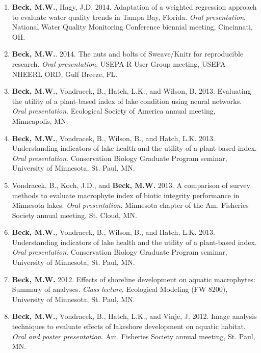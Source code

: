 \documentclass[letterpaper,12pt]{article}
\begin{document}
\begin{enumerate}
\item {\bf Beck, M.W.}, Hagy, J.D. 2014. Adaptation of a weighted regression approach to evaluate water quality trends in {T}ampa {B}ay, {F}lorida. \textit{Oral presentation}. National Water Quality Monitoring Conference biennial meeting, Cincinnati, OH.

\item {\bf Beck, M.W.}. 2014. The nuts and bolts of Sweave/Knitr for reproducible research. \textit{Oral presentation}. USEPA R User Group meeting, USEPA NHEERL ORD, Gulf Breeze, FL.

\item {\bf Beck, M.W.}, Vondracek, B., Hatch, L.K., and Wilson, B. 2013. Evaluating the utility of a plant-based index of lake condition using neural networks. \textit{Oral presentation}. Ecological Society of America annual meeting, Minneapolis, MN.

\item {\bf Beck, M.W.}, Vondracek, B., Wilson, B., and Hatch, L.K. 2013. Understanding indicators of lake health and the utility of a plant-based index. \textit{Oral presentation}. Conservation Biology Graduate Program seminar, University of Minnesota, St. Paul, MN.

\item Vondracek, B., Koch, J.D., and {\bf Beck, M.W.} 2013. A comparison of survey methods to evaluate macrophyte index of biotic integrity performance in Minnesota lakes. \textit{Oral presentation}. Minnesota chapter of the Am. Fisheries Society annual meeting, St. Cloud, MN.

\item {\bf Beck, M.W.}, Vondracek, B., Wilson, B., and Hatch, L.K. 2013. Understanding indicators of lake health and the utility of a plant-based index. \textit{Oral presentation}. Conservation Biology Graduate Program seminar, University of Minnesota, St. Paul, MN.

\item {\bf Beck, M.W.} 2012. Effects of shoreline development on aquatic macrophytes: Summary of analyses. \textit{Class lecture}. Ecological Modeling (FW 8200), University of Minnesota, St. Paul, MN.

\item {\bf Beck, M.W.}, Vondracek, B., Hatch, L.K., and Vinje, J. 2012. Image analysis techniques to evaluate effects of lakeshore development on aquatic habitat. \textit{Oral and poster presentation}. Am. Fisheries Society annual meeting, St. Paul, MN.


\end{enumerate}
\end{document}
